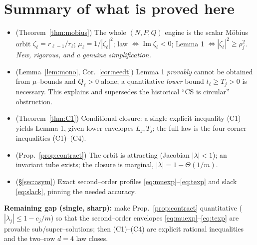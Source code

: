 \documentclass[11pt]{article}
\theoremstyle{definition}
\newcommand{\Im}{\operatorname{Im}}
\begin{document}
\section*{Summary of what is proved here}
\begin{itemize}
\item[\textbf{P1}] (Theorem~\ref{thm:mobius}) The whole $(N,P,Q)$ engine is the
scalar M\"obius orbit $\zeta_\ell=r_{\ell-1}/r_\ell$; $\mu_\ell=1/|\zeta_\ell|^2$;
law $\iff\Im\zeta_\ell<0$; Lemma 1 $\iff|\zeta_\ell|^2\ge\rho_j^2$. \emph{New,
rigorous, and a genuine simplification.}
\item[\textbf{P2}] (Lemma~\ref{lem:mono}, Cor.~\ref{cor:needt}) Lemma 1
\emph{provably} cannot be obtained from $\mu$--bounds and $Q_\ell>0$ alone; a
quantitative \emph{lower} bound $t_\ell\ge T_j>0$ is necessary. This explains and
supersedes the historical ``CS is circular'' obstruction.
\item[\textbf{P3}] (Theorem~\ref{thm:C1}) Conditional closure: a single explicit
inequality (C1) yields Lemma 1, given lower envelopes $L_j,T_j$; the full law is
the four corner inequalities (C1)--(C4).
\item[\textbf{P4}] (Prop.~\ref{prop:contract}) The orbit is attracting (Jacobian
$|\lambda|<1$); an invariant tube exists; the closure is marginal,
$|\lambda|=1-\Theta(1/m)$.
\item[\textbf{P5}] (\S\ref{sec:asym}) Exact second--order profiles
\eqref{eq:muexp}--\eqref{eq:texp} and slack \eqref{eq:slack}, pinning the needed
accuracy.
\end{itemize}
\noindent\textbf{Remaining gap (single, sharp):} make Prop.~\ref{prop:contract}
quantitative ($|\lambda_j|\le1-c_j/m$) so that the second--order envelopes
\eqref{eq:muexp}--\eqref{eq:texp} are provable sub/super--solutions; then
(C1)--(C4) are explicit rational inequalities and the two--row $d{=}4$ law closes.
\end{document}
